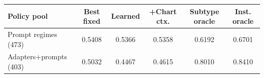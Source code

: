 \begin{tabular}{lccccc}
\toprule
Policy pool & Best fixed & Learned & +Chart ctx. & Subtype oracle & Inst. oracle \\
\midrule
Prompt regimes (473) & 0.5408 & 0.5366 & 0.5358 & 0.6192 & 0.6701 \\
Adapters+prompts (403) & 0.5032 & 0.4467 & 0.4615 & 0.8010 & 0.8410 \\
\bottomrule
\end{tabular}
